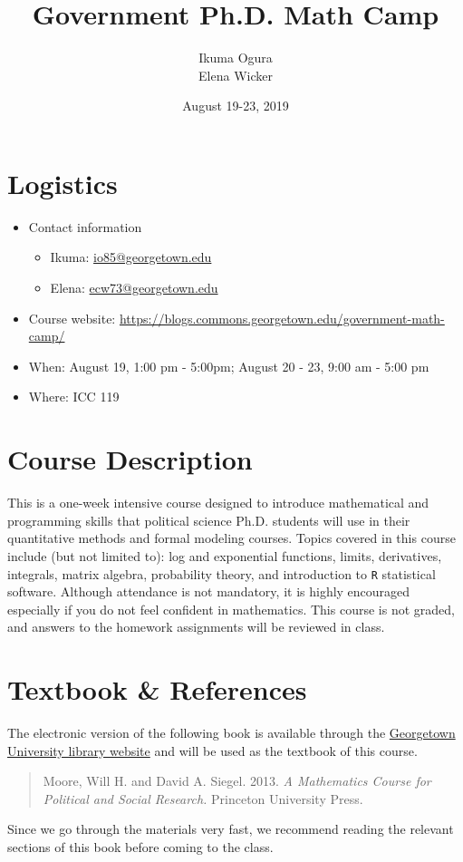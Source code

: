\documentclass[pdflatex, letterpaper, 12pt]{scrartcl}
\title{Government Ph.D. Math Camp}
\author{Ikuma Ogura \\ Elena Wicker}
\date{August 19-23, 2019}
\begin{document}
\maketitle

\section*{Logistics}

\begin{itemize}
\item Contact information
 \begin{itemize}
 \item Ikuma: \href{mailto:io85@georgetown.edu}{io85@georgetown.edu}
 \item Elena: \href{mailto:ecw73@georgetown.edu}{ecw73@georgetown.edu}
 \end{itemize}
\item Course website: \href{https://blogs.commons.georgetown.edu/government-math-camp/}{https://blogs.commons.georgetown.edu/government-math-camp/}
\item When: August 19, 1:00 pm - 5:00pm; August 20 - 23, 9:00 am - 5:00 pm
\item Where: ICC 119
\end{itemize}

\section*{Course Description}

This is a one-week intensive course designed to introduce mathematical and programming skills that political science Ph.D. students will use in their quantitative methods and formal modeling courses. Topics covered in this course include (but not limited to): log and exponential functions, limits, derivatives, integrals, matrix algebra, probability theory, and introduction to \texttt{R} statistical software. Although attendance is not mandatory, it is highly encouraged especially if you do not feel confident in mathematics. This course is not graded, and answers to the homework assignments will be reviewed in class.   

\section*{Textbook \& References}

The electronic version of the following book is available through the \href{https://www.library.georgetown.edu/}{Georgetown University library website} and will be used as the textbook of this course.
\begin{quote}
Moore, Will H. and David A. Siegel. 2013. \emph{A Mathematics Course for Political and Social Research.} Princeton University Press.
\end{quote}
Since we go through the materials very fast, we recommend reading the relevant sections of this book before coming to the class.
\end{document}
